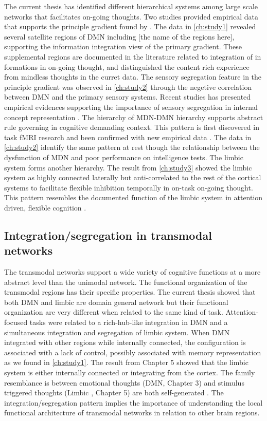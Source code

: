 The current thesis has identified different hierarchical systems among large scale networks that facilitates on-going thoughts. Two studies provided empirical data that supports the principle gradient found by . The data in \cref{ch:study1} revealed several satellite regions of DMN including [the name of the regions here], supporting the information integration view of the primary gradient. These supplemental regions are documented in the literature related to integration of in formations in on-going thought\cite{Ellamil2016,Karapanagiotidis2017,Smallwood2016}, and distinguished the content rich experience from mindless thoughts in the curret data. The sensory segregation feature in the principle gradient was observed in \cref{ch:study2} through the negetive correlation between DMN and the primary sensory systems. Recent studies has presented empirical evidences supporting the importance of sensory segregation in internal concept representation \cite{Murphy2018,Villena-Gonzalez2018}. The hierarchy of MDN-DMN hierarchy supports abstract rule governing in cognitive demanding context. This pattern is first discovered in task fMRI research \cite{Duncan2010} and been confirmed with new empirical data \cite{Crittenden2016}. The data in \cref{ch:study2} identify the same pattern at rest though the relationship between the dysfunction of MDN and poor performance on intelligence tests. The limbic system forms another hierarchy. The result from \cref{ch:study3} 
showed the limbic system as highly connected laterally but anti-correlated to the rest of the cortical systems to facilitate flexible inhibition temporally in on-task on-going thought. This pattern resembles the documented function of the limbic system in attention driven, flexible cognition \cite{Kleckner2017}.

\subsection{Integration/segregation in transmodal networks}
The transmodal networks support a wide variety of cognitive functions at a more abstract level than the unimodal network. The functional organization of the transmodal regions has their specific properties. The current thesis showed that both DMN and limbic are domain general network but their functional organization are very different when related to the same kind of task. Attention-focused tasks were related to a rich-hub-like integration in DMN and a simultaneous integration and segregation of limbic system. When DMN integrated with other regions while internally connected, the configuration is associated with a lack of control, possibly associated with memory representation as we found in \cref{ch:study1}. The result from Chapter 5 showed that the limbic system is either internally connected or integrating from the cortex. The family resemblance is between emotional thoughts (DMN, Chapter 3) and stimulus triggered thoughts (Limbic , Chapter 5) are both self-generated \cite{Tusche2014}. The integration/segregation pattern implies the importance of understanding the local functional architecture \cite{Braga2015} of transmodal networks in relation to other brain regions.

